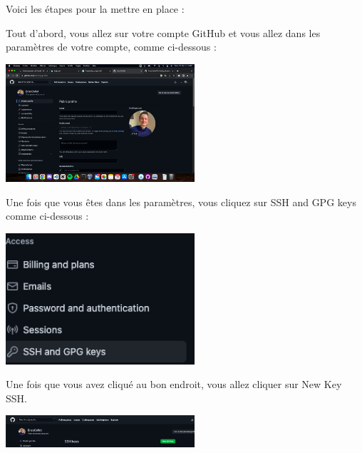 \documentclass[12pt]{article}
\begin{document}
Voici les étapes pour la mettre en place :

\vspace{0.3cm}

Tout d'abord, vous allez sur votre compte GitHub et vous allez dans les paramètres de votre compte, comme ci-dessous :

\vspace{0.3cm}

\begin{center}
  \includegraphics[width=7cm]{Images-TD-Git/Image-TD-Git-5/setting-github.png}
\end{center}

\vspace{0.3cm}

Une fois que vous êtes dans les paramètres, vous cliquez sur SSH and GPG keys comme ci-dessous :

\vspace{0.3cm}

\begin{center}
  \includegraphics[width=7cm]{Images-TD-Git/Image-TD-Git-5/ssh-gpg.png}
\end{center}

Une fois que vous avez cliqué au bon endroit, vous allez cliquer sur New Key SSH.

\vspace{0.3cm}

\begin{center}
  \includegraphics[width=7cm]{Images-TD-Git/Image-TD-Git-5/new-ssh-key.png}
\end{center}
\end{document}
